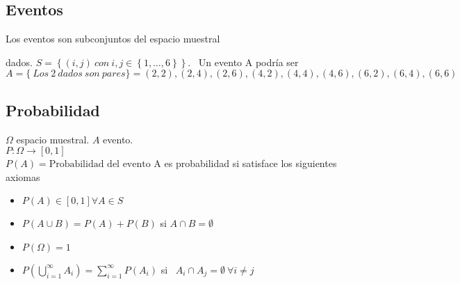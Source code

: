 \documentclass[a4paper,10pt]{article}
\begin{document}
\subsection{Eventos}
Los eventos son subconjuntos del espacio muestral

 dados. $S = \left\lbrace (i,j) \ con \ i,j \in \left\lbrace 1,\dots,6 \right \rbrace \right\rbrace$. \
Un evento A podría ser $A = \{\ Los \ 2 \ dados \ son \ pares\} = {(2,2),(2,4),(2,6),(4,2),(4,4),(4,6),(6,2),(6,4),(6,6)}$ \\


\subsection{Probabilidad}
$\Omega$ espacio muestral. $A$ evento.\\ 
$P : \Omega \longrightarrow [0,1]$ \\
$P(A) = \mbox{Probabilidad del evento A}$
es probabilidad si satisface los siguientes axiomas
\begin{itemize}
\item $P(A) \in [0,1] \forall A \in S$
\item $P(A \cup B) = P(A) + P(B)$ si $A \cap B = \emptyset$
\item $P(\Omega) = 1$
\item $P(\bigcup_{i=1}^{\infty} {A_i}) = \sum_{i=1}^{\infty} {P(A_i)}$ si \ $A_i \cap A_j = \emptyset \ \forall i \neq j$
\end{itemize}
\end{document}
